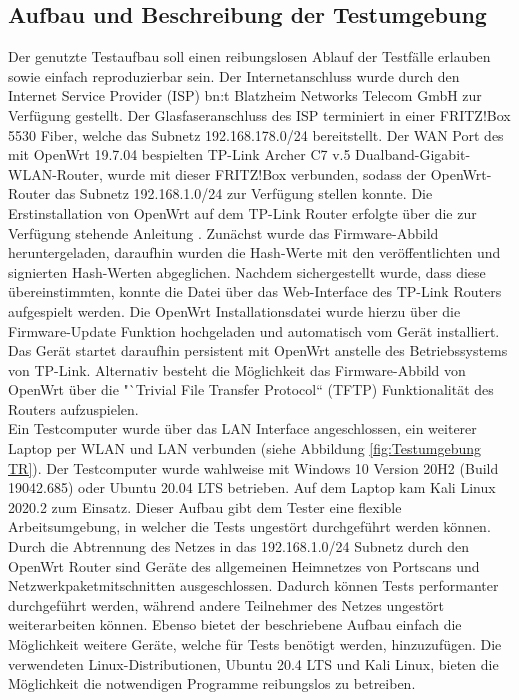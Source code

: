 \documentclass[a4paper]{book}
\begin{document}
\begin{large}
\section{Aufbau und Beschreibung der Testumgebung}
\label{umgebung}
\begin{onehalfspace}
Der genutzte Testaufbau soll einen reibungslosen Ablauf der Testfälle erlauben sowie einfach reproduzierbar sein. Der Internetanschluss wurde durch den Internet Service Provider (ISP) bn:t Blatzheim Networks Telecom GmbH zur Verfügung gestellt. Der Glasfaseranschluss des ISP terminiert in einer FRITZ!Box 5530 Fiber, welche das Subnetz 192.168.178.0/24 bereitstellt. Der WAN Port des mit OpenWrt 19.7.04 bespielten TP-Link Archer C7 v.5 Dualband-Gigabit-WLAN-Router, wurde mit dieser FRITZ!Box verbunden, sodass der OpenWrt-Router das Subnetz 192.168.1.0/24 zur Verfügung stellen konnte. Die Erstinstallation von OpenWrt auf dem TP-Link Router erfolgte über die zur Verfügung stehende Anleitung \cite{OpenWrtWebseite.2019}. Zunächst wurde das Firmware-Abbild heruntergeladen, daraufhin wurden die Hash-Werte mit den veröffentlichten und signierten Hash-Werten abgeglichen. Nachdem sichergestellt wurde, dass diese übereinstimmten, konnte die Datei über das Web-Interface des TP-Link Routers aufgespielt werden. Die OpenWrt Installationsdatei wurde hierzu über die Firmware-Update Funktion hochgeladen und automatisch vom Gerät installiert. Das Gerät startet daraufhin persistent mit OpenWrt anstelle des Betriebssystems von TP-Link. \mbox Alternativ besteht die Möglichkeit das Firmware-Abbild von OpenWrt über die "`Trivial File Transfer Protocol“ (TFTP) Funktionalität des Routers aufzuspielen. \\
\indent Ein Testcomputer wurde über das LAN Interface angeschlossen, ein weiterer Laptop per WLAN und LAN verbunden (siehe Abbildung \ref{fig:Testumgebung TR}). 
Der Testcomputer wurde wahlweise mit Windows 10 Version 20H2 (Build 19042.685) oder Ubuntu 20.04 LTS betrieben. Auf dem Laptop kam Kali Linux 2020.2 zum Einsatz. Dieser Aufbau gibt dem Tester eine flexible Arbeitsumgebung, in welcher die Tests ungestört durchgeführt werden können. Durch die Abtrennung des Netzes in das 192.168.1.0/24 Subnetz durch den OpenWrt Router sind Geräte des allgemeinen Heimnetzes von Portscans und Netzwerkpaketmitschnitten ausgeschlossen. Dadurch können Tests performanter durchgeführt werden, während andere Teilnehmer des Netzes ungestört weiterarbeiten können. Ebenso bietet der beschriebene Aufbau einfach die Möglichkeit weitere Geräte, welche für Tests benötigt werden, hinzuzufügen. Die verwendeten Linux-Distributionen, Ubuntu 20.4 LTS und Kali Linux, bieten die Möglichkeit die notwendigen Programme reibungslos zu betreiben. 


\end{onehalfspace}
\end{large}
\end{document}
